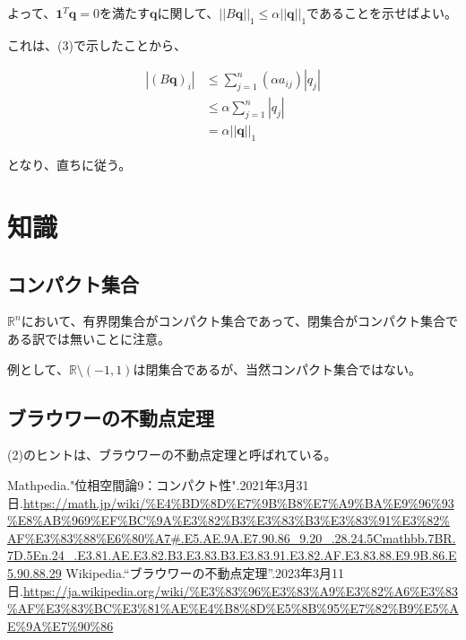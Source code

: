 \documentclass[a4paper, 10pt, dvipdfmx]{jlreq}
\begin{document}
よって、$\bm{1}^T\bm{q}=0$を満たす$\bm{q}$に関して、$||B\bm{q}||_1\leq \alpha||\bm{q}||_1$であることを示せばよい。

これは、(3)で示したことから、

\begin{align*}
    |(B\bm{q})_i| & \leq \sum_{j=1}^n(\alpha a_{ij})|q_j| \\
                  & \leq \alpha \sum_{j=1}^n |q_j|        \\
                  & =\alpha ||\bm{q}||_1
\end{align*}

となり、直ちに従う。

\section{知識}

\subsection{コンパクト集合}

$\mathbb{R}^n$において、有界閉集合がコンパクト集合であって、閉集合がコンパクト集合である訳では無いことに注意。

例として、$\mathbb{R} \setminus (-1,1)$は閉集合であるが、当然コンパクト集合ではない。

\subsection{ブラウワーの不動点定理}

(2)のヒントは、ブラウワーの不動点定理と呼ばれている。


\begin{thebibliography}{9}
    Mathpedia."位相空間論9：コンパクト性".2021年3月31日.\url{https://math.jp/wiki/%E4%BD%8D%E7%9B%B8%E7%A9%BA%E9%96%93%E8%AB%969%EF%BC%9A%E3%82%B3%E3%83%B3%E3%83%91%E3%82%AF%E3%83%88%E6%80%A7#.E5.AE.9A.E7.90.86_9.20_.28.24.5Cmathbb.7BR.7D.5En.24_.E3.81.AE.E3.82.B3.E3.83.B3.E3.83.91.E3.82.AF.E3.83.88.E9.9B.86.E5.90.88.29}
    Wikipedia.“ブラウワーの不動点定理”.2023年3月11日.\url{https://ja.wikipedia.org/wiki/%E3%83%96%E3%83%A9%E3%82%A6%E3%83%AF%E3%83%BC%E3%81%AE%E4%B8%8D%E5%8B%95%E7%82%B9%E5%AE%9A%E7%90%86}
\end{thebibliography}
\end{document}
